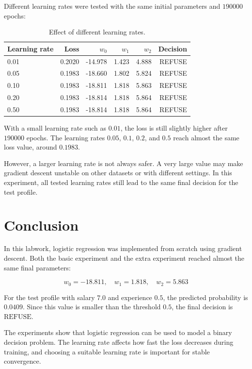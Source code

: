 \documentclass[12pt,a4paper]{article}
\begin{document}
Different learning rates were tested with the same initial parameters and \(190000\) epochs:

\begin{table}[H]
\centering
\begin{tabular}{lrrrrr}
\toprule
Learning rate & Loss & \(w_0\) & \(w_1\) & \(w_2\) & Decision \\
\midrule
0.01 & 0.2020 & -14.978 & 1.423 & 4.888 & REFUSE \\
0.05 & 0.1983 & -18.660 & 1.802 & 5.824 & REFUSE \\
0.10 & 0.1983 & -18.811 & 1.818 & 5.863 & REFUSE \\
0.20 & 0.1983 & -18.814 & 1.818 & 5.864 & REFUSE \\
0.50 & 0.1983 & -18.814 & 1.818 & 5.864 & REFUSE \\
\bottomrule
\end{tabular}
\caption{Effect of different learning rates.}
\end{table}

With a small learning rate such as \(0.01\), the loss is still slightly higher after \(190000\) epochs. The learning rates \(0.05\), \(0.1\), \(0.2\), and \(0.5\) reach almost the same loss value, around \(0.1983\).

However, a larger learning rate is not always safer. A very large value may make gradient descent unstable on other datasets or with different settings. In this experiment, all tested learning rates still lead to the same final decision for the test profile.

\section{Conclusion}

In this labwork, logistic regression was implemented from scratch using gradient descent.
Both the basic experiment and the extra experiment reached almost the same final parameters:

\[
w_0 = -18.811, \quad w_1 = 1.818, \quad w_2 = 5.863
\]

For the test profile with salary \(7.0\) and experience \(0.5\), the predicted probability is \(0.0409\). Since this value is smaller than the threshold \(0.5\), the final decision is \(\text{REFUSE}\).

The experiments show that logistic regression can be used to model a binary decision problem. The learning rate affects how fast the loss decreases during training, and choosing a suitable learning rate is important for stable convergence.
\end{document}

